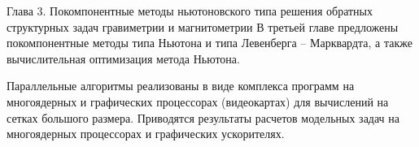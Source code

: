 \documentclass[10pt,pdf, mathserif, hyperref={unicode}]{beamer}
\begin{document}
%	
%		

\begin{frame}{Глава 3. Покомпонентные методы ньютоновского типа решения обратных структурных задач гравиметрии и магнитометрии}
	В третьей главе предложены покомпонентные методы типа Ньютона и типа Левенберга -- Марквардта, а также вычислительная оптимизация метода Ньютона. 
	
	Параллельные алгоритмы реализованы в виде комплекса программ на многоядерных и графических процессорах (видеокартах) для вычислений на сетках большого размера. Приводятся результаты расчетов модельных задач на многоядерных процессорах и графических ускорителях. 
	
\end{frame}
\end{document}
